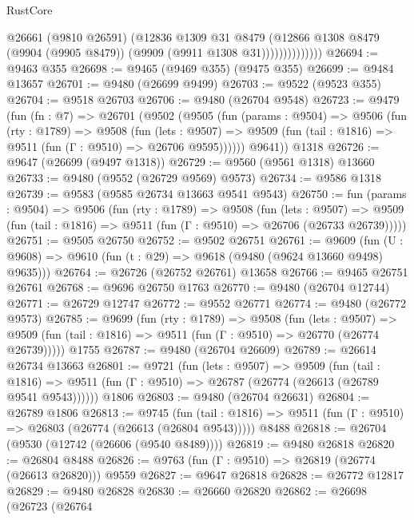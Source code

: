 \begin{lexlean}{RustCore}
\begin{coremodule}
                        @26661
                        (@9810 @26591)
                        (@12836
                          @1309
                          @31
                          @8479
                          (@12866
                            @1308
                            @8479
                            (@9904 (@9905 @8479))
                            (@9909 (@9911 @1308 @31))))))))))))))
@26694 := @9463 @355
@26698 := @9465 (@9469 @355) (@9475 @355)
@26699 := @9484 @13657
@26701 := @9480 (@26699 @9499)
@26703 := @9522 (@9523 @355)
@26704 := @9518 @26703
@26706 := @9480 (@26704 @9548)
@26723 := @9479
    (fun (fn : @7) =>
    @26701
      (@9502
        (@9505
          (fun (params : @9504) =>
          @9506
            (fun (rty : @1789) =>
            @9508
              (fun (lets : @9507) =>
              @9509 (fun (tail : @1816) => @9511 (fun (Γ : @9510) => @26706 @9595))))))
        @9641))
    @1318
@26726 := @9647 (@26699 (@9497 @1318))
@26729 := @9560 (@9561 @1318) @13660
@26733 := @9480 (@9552 (@26729 @9569) @9573)
@26734 := @9586 @1318
@26739 := @9583 (@9585 @26734 @13663 @9541 @9543)
@26750 := fun (params : @9504) =>
  @9506
    (fun (rty : @1789) =>
    @9508
      (fun (lets : @9507) =>
      @9509 (fun (tail : @1816) => @9511 (fun (Γ : @9510) => @26706 (@26733 @26739)))))
@26751 := @9505 @26750
@26752 := @9502 @26751
@26761 := @9609
    (fun (U : @9608) => @9610 (fun (t : @29) => @9618 (@9480 (@9624 @13660 @9498) @9635)))
@26764 := @26726 (@26752 @26761) @13658
@26766 := @9465 @26751 @26761
@26768 := @9696 @26750 @1763
@26770 := @9480 (@26704 @12744)
@26771 := @26729 @12747
@26772 := @9552 @26771
@26774 := @9480 (@26772 @9573)
@26785 := @9699
    (fun (rty : @1789) =>
    @9508
      (fun (lets : @9507) =>
      @9509 (fun (tail : @1816) => @9511 (fun (Γ : @9510) => @26770 (@26774 @26739)))))
    @1755
@26787 := @9480 (@26704 @26609)
@26789 := @26614 @26734 @13663
@26801 := @9721
    (fun (lets : @9507) =>
    @9509
      (fun (tail : @1816) =>
      @9511 (fun (Γ : @9510) => @26787 (@26774 (@26613 (@26789 @9541 @9543))))))
    @1806
@26803 := @9480 (@26704 @26631)
@26804 := @26789 @1806
@26813 := @9745
    (fun (tail : @1816) => @9511 (fun (Γ : @9510) => @26803 (@26774 (@26613 (@26804 @9543)))))
    @8488
@26818 := @26704 (@9530 (@12742 (@26606 (@9540 @8489))))
@26819 := @9480 @26818
@26820 := @26804 @8488
@26826 := @9763 (fun (Γ : @9510) => @26819 (@26774 (@26613 @26820))) @9559
@26827 := @9647 @26818
@26828 := @26772 @12817
@26829 := @9480 @26828
@26830 := @26660 @26820
@26862 := @26698
    (@26723
      (@26764

\end{coremodule}
\end{lexlean}
